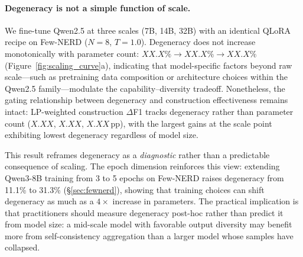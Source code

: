 
\newcommand{\scaleSevenDegen}{XX.X}    %
\newcommand{\scaleFourteenDegen}{XX.X} %
\newcommand{\scaleThirtytwoDegen}{XX.X}%
\newcommand{\scaleSevenGreedy}{.XXX}   %
\newcommand{\scaleFourteenGreedy}{.XXX}%
\newcommand{\scaleThirtytwoGreedy}{.XXX}%
\newcommand{\scaleSevenConstr}{X.XX}   %
\newcommand{\scaleFourteenConstr}{X.XX}%
\newcommand{\scaleThirtytwoConstr}{X.XX}%
\newcommand{\scaleSevenLP}{.XXX}       %
\newcommand{\scaleFourteenLP}{.XXX}    %
\newcommand{\scaleThirtytwoLP}{.XXX}   %


\paragraph{Degeneracy is not a simple function of scale.}
We fine-tune Qwen2.5 at three scales (7B, 14B, 32B) with an identical QLoRA recipe on Few-NERD ($N{=}8$, $T{=}1.0$).
Degeneracy does not increase monotonically with parameter count: $\scaleSevenDegen\%\to\scaleFourteenDegen\%\to\scaleThirtytwoDegen\%$ (Figure~\ref{fig:scaling_curve}a), indicating that model-specific factors beyond raw scale---such as pretraining data composition or architecture choices within the Qwen2.5 family---modulate the capability--diversity tradeoff.
Nonetheless, the gating relationship between degeneracy and construction effectiveness remains intact: LP-weighted construction $\Delta$F1 tracks degeneracy rather than parameter count ($\scaleSevenConstr$, $\scaleFourteenConstr$, $\scaleThirtytwoConstr$\,pp), with the largest gains at the scale point exhibiting lowest degeneracy regardless of model size.

This result reframes degeneracy as a \emph{diagnostic} rather than a predictable consequence of scaling.
The epoch dimension reinforces this view: extending Qwen3-8B training from 3 to 5 epochs on Few-NERD raises degeneracy from 11.1\% to 31.3\% (\S\ref{sec:fewnerd}), showing that training choices can shift degeneracy as much as a $4{\times}$ increase in parameters.
The practical implication is that practitioners should measure degeneracy post-hoc rather than predict it from model size: a mid-scale model with favorable output diversity may benefit more from self-consistency aggregation than a larger model whose samples have collapsed.
